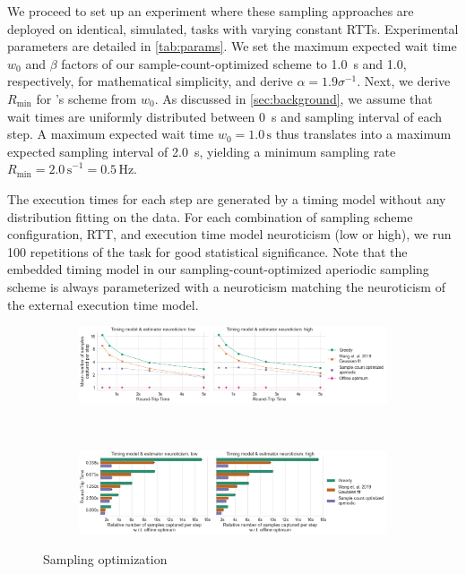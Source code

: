 We proceed to set up an experiment where these sampling approaches are deployed on identical, simulated, tasks with varying constant \acp{RTT}.
Experimental parameters are detailed in \cref{tab:params}.
We set the maximum expected wait time \( w_0 \) and \( \beta \) factors of our sample-count-optimized scheme to \SI{1.0}{\second} and \num{1.0}, respectively, for mathematical simplicity, and derive \( \alpha = 1.9 \sigma^{-1} \).
Next, we derive \( R_\text{min} \) for \textcite{Wang2019Towards}'s scheme from \( w_0 \).
As discussed in \cref{sec:background}, we assume that wait times are uniformly distributed between \SI{0}{\second} and sampling interval of each step.
A maximum expected wait time \( w_0 = 1.0\,\si{\second} \) thus translates into a maximum expected sampling interval of \SI{2.0}{\second}, yielding a minimum sampling rate \( R_\text{min} = {2.0\,\si{\second}}^{-1} = 0.5\,\si{\hertz} \).


The execution times for each step are generated by a timing model without any distribution fitting on the data.
For each combination of sampling scheme configuration, \ac{RTT}, and execution time model neuroticism (low or high), we run \num{100} repetitions of the task for good statistical significance.
Note that the embedded timing model in our sampling-count-optimized aperiodic sampling scheme is always parameterized with a neuroticism matching the neuroticism of the external execution time model.

\begin{figure}
    \centering
    \begin{subfigure}[t]{\textwidth}
        \centering
        \includegraphics[width=\textwidth]{figs/new_model/sampling_optimization.png}
        \caption{}
    \end{subfigure}\\
    \medskip
    \begin{subfigure}[t]{\textwidth}
        \centering
        \includegraphics[width=\textwidth]{figs/new_model/sampling_optimization_diff.png}
        \caption{}
    \end{subfigure}
    \caption{Sampling optimization}\label{fig:optimization:samples}
\end{figure}

